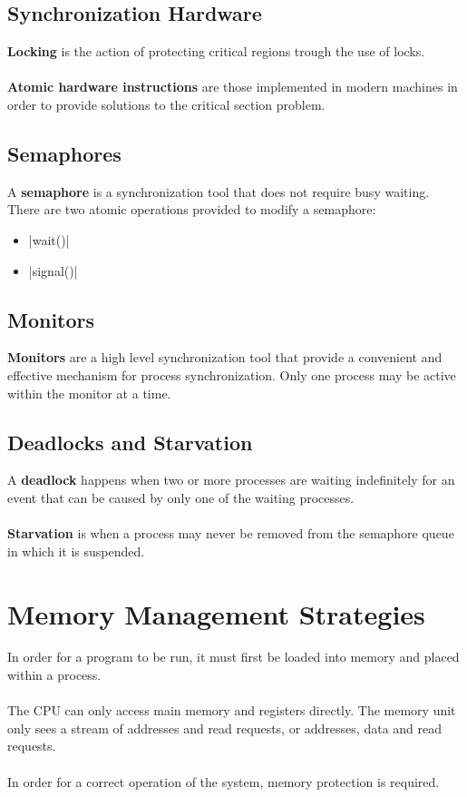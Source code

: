 \documentclass{article}
\begin{document}
\subsection{Synchronization Hardware}
\textbf{Locking} is the action of protecting critical regions trough the use of locks. \\ \\
\textbf{Atomic hardware instructions} are those implemented in modern machines in order to provide solutions to the critical section problem.

\subsection{Semaphores}
A \textbf{semaphore} is a synchronization tool that does not require busy waiting. There are two atomic operations provided to modify a semaphore:

\begin{itemize}
	\item \cverb|wait()|
	\item \cverb|signal()|
\end{itemize}

\subsection{Monitors}
\textbf{Monitors} are a high level synchronization tool that provide a convenient and effective mechanism for process synchronization. Only one process may be active within the monitor at a time.

\subsection{Deadlocks and Starvation}
A \textbf{deadlock} happens when two or more processes are waiting indefinitely for an event that can be caused by only one of the waiting processes. \\ \\
\textbf{Starvation} is when a process may never be removed from the semaphore queue in which it is suspended.

\section{Memory Management Strategies}
In order for a program to be run, it must first be loaded into memory and placed within a process. \\ \\
The CPU can only access main memory and registers directly. The memory unit only sees a stream of addresses and read requests, or addresses, data and read requests. \\ \\
In order for a correct operation of the system, memory protection is required.
\end{document}
